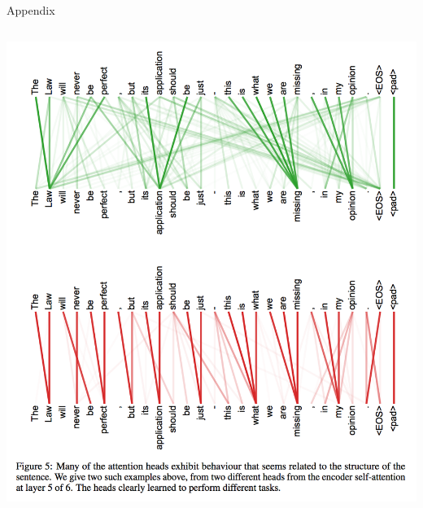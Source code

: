 \documentclass{beamer}
\begin{document}
\begin{frame}{Appendix}{}
\begin{columns}[T]
\begin{column}{.48\textwidth}
\begin{minipage}[c][.48\textheight][c]{\linewidth}
\includegraphics[width=\textwidth]{img/attn_diff.png}
\end{minipage}
\end{column}%
\end{columns}

\end{frame}
%
\end{document}
